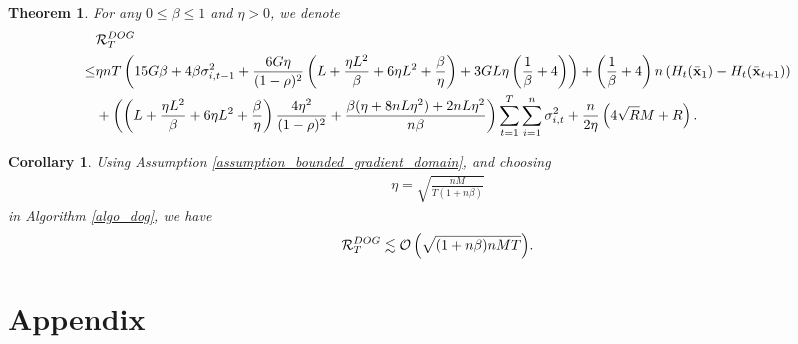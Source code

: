 \documentclass{article}
\newtheorem{Theorem}{\bf{Theorem}}
\newtheorem{Corollary}{\bf{Corollary}}
\begin{document}
\begin{Theorem}
\label{theorem_regret_upper_bound}
For any $0\le \beta \le 1$ and $\eta>0$, we denote 
\begin{align}
\nonumber
& {\mathcal{R}}_T^{DOG} \\ \nonumber 
\le &  \eta nT\left(  15G\beta + 4\beta\sigma_{i,t-1}^2 + \frac{6G\eta}{(1-\rho)^2}\left(  L + \frac{\eta L^2}{\beta} + 6\eta L^2 + \frac{\beta}{\eta}  \right) + 3GL\eta\left( \frac{1}{\beta} + 4 \right)   \right) + \left( \frac{1}{\beta}+4 \right)n \left( H_t(\bar{{\bf x}}_1) - H_t(\bar{{\bf x}}_{t+1}) \right) \\ \nonumber
& + \left(  \left(  L + \frac{\eta L^2}{\beta}  + 6\eta L^2  + \frac{\beta}{\eta}  \right) \frac{4\eta^2}{(1-\rho)^2} + \frac{\beta(\eta + 8nL\eta^2) + 2nL\eta^2}{n\beta}  \right) \sum_{t=1}^T\sum_{i=1}^n \sigma_{i,t}^2 + \frac{n}{2\eta}\left(  4\sqrt{R}M + R   \right).
\end{align} 


\end{Theorem}


\begin{Corollary}
Using Assumption \ref{assumption_bounded_gradient_domain}, and choosing 
\begin{align}
\nonumber
\eta = \sqrt{\frac{nM}{T(1+n\beta)}}
\end{align} in Algorithm \ref{algo_dog}, we have
\begin{align}
\nonumber
{\mathcal{R}}_T^{DOG} \lesssim {\mathcal{O}\left( \sqrt{ (1+n\beta)nMT }  \right)}.
\end{align}






\end{Corollary}








\section*{Appendix}
\end{document}
